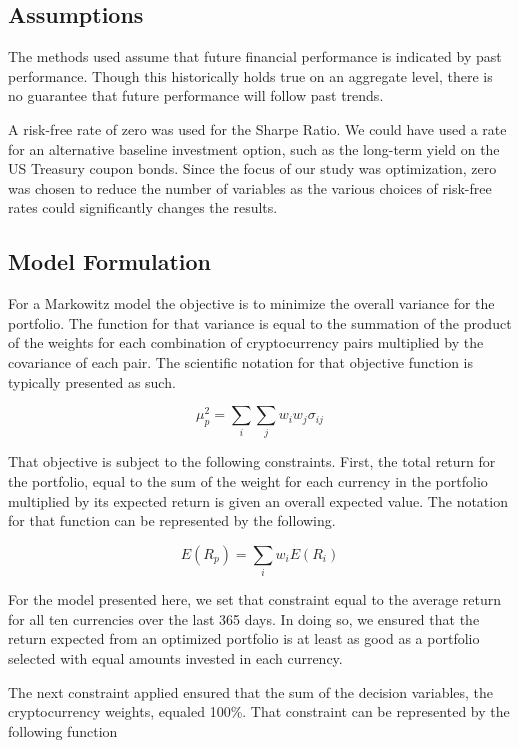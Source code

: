 \documentclass[11pt]{article} %
\begin{document}
\subsection{Assumptions}

The methods used assume that future financial performance is indicated by past performance. Though this historically holds true on an aggregate level, there is no guarantee that future performance will follow past trends. 

A risk-free rate of zero was used for the Sharpe Ratio. We could have used a rate for an alternative baseline investment option, such as the long-term yield on the US Treasury coupon bonds. Since the focus of our study was optimization, zero was chosen to reduce the number of variables as the various choices of risk-free rates could significantly changes the results.

\subsection{Model Formulation}

For a Markowitz model the objective is to minimize the overall variance for the portfolio.  The function for that variance is equal to the summation of the product of the weights for each combination of cryptocurrency pairs multiplied by the covariance of each pair.  The scientific notation for that objective function is typically presented as such. 

\begin{equation} 
\mu_p^2  = \sum_i \sum_j w_i w_j \sigma_{ij}
\end{equation}

That objective is subject to the following constraints.  First, the total return for the portfolio, equal to the sum of the weight for each currency in the portfolio multiplied by its expected return is given an overall expected value.  The notation for that function can be represented by the following.

\begin{equation} 
E(R_p) = \sum_i w_i E(R_i)
\end{equation}
 
For the model presented here, we set that constraint equal to the average return for all ten currencies over the last 365 days. In doing so, we ensured that the return expected from an optimized portfolio is at least as good as a portfolio selected with equal amounts invested in each currency.
 
The next constraint applied ensured that the sum of the decision variables, the cryptocurrency weights, equaled 100\%.  That constraint can be represented by the following function
\end{document}
